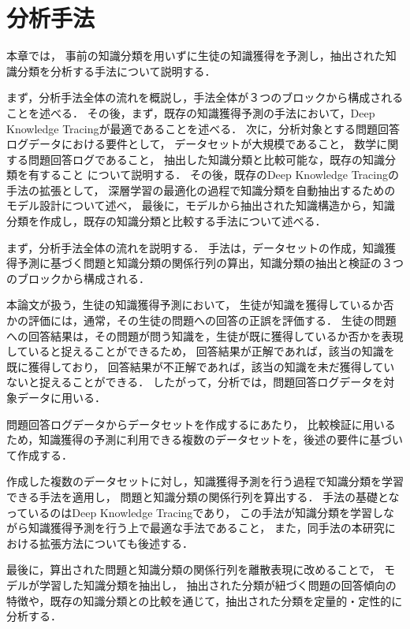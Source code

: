 \chapter{分析手法}
\label{chap:method}
\fancyhf{}
\rhead{\thepage}
\cfoot{\thepage}
本章では，
事前の知識分類を用いずに生徒の知識獲得を予測し，抽出された知識分類を分析する手法について説明する．

まず，分析手法全体の流れを概説し，手法全体が３つのブロックから構成されることを述べる．
その後，まず，既存の知識獲得予測の手法において，Deep Knowledge Tracingが最適であることを述べる．
次に，分析対象とする問題回答ログデータにおける要件として，
データセットが大規模であること，
数学に関する問題回答ログであること，
抽出した知識分類と比較可能な，既存の知識分類を有すること
について説明する．
その後，既存のDeep Knowledge Tracingの手法の拡張として，
深層学習の最適化の過程で知識分類を自動抽出するためのモデル設計について述べ，
最後に，モデルから抽出された知識構造から，知識分類を作成し，既存の知識分類と比較する手法について述べる．


\vvspace


まず，分析手法全体の流れを説明する．
手法は，データセットの作成，知識獲得予測に基づく問題と知識分類の関係行列の算出，知識分類の抽出と検証の３つのブロックから構成される．

本論文が扱う，生徒の知識獲得予測において，
生徒が知識を獲得しているか否かの評価には，通常，その生徒の問題への回答の正誤を評価する．
生徒の問題への回答結果は，その問題が問う知識を，生徒が既に獲得しているか否かを表現していると捉えることができるため，
回答結果が正解であれば，該当の知識を既に獲得しており，
回答結果が不正解であれば，該当の知識を未だ獲得していないと捉えることができる．
したがって，分析では，問題回答ログデータを対象データに用いる．


問題回答ログデータからデータセットを作成するにあたり，
比較検証に用いるため，知識獲得の予測に利用できる複数のデータセットを，後述の要件に基づいて作成する．


作成した複数のデータセットに対し，知識獲得予測を行う過程で知識分類を学習できる手法を適用し，
問題と知識分類の関係行列を算出する．
手法の基礎となっているのはDeep Knowledge Tracingであり，
この手法が知識分類を学習しながら知識獲得予測を行う上で最適な手法であること，
また，同手法の本研究における拡張方法についても後述する．


最後に，算出された問題と知識分類の関係行列を離散表現に改めることで，
モデルが学習した知識分類を抽出し，
抽出された分類が紐づく問題の回答傾向の特徴や，既存の知識分類との比較を通じて，抽出された分類を定量的・定性的に分析する．



